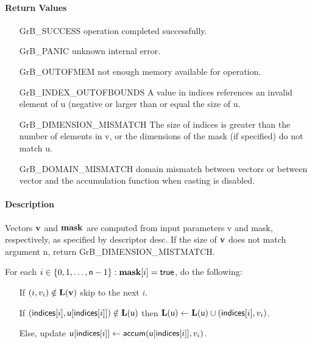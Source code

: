 \paragraph{Return Values}

\begin{itemize}[leftmargin=2.1in]
\item[{\sf GrB\_SUCCESS}]      operation completed successfully.
\item[{\sf GrB\_PANIC}]        unknown internal error.
\item[{\sf GrB\_OUTOFMEM}]     not enough memory available for operation.
\item[{\sf GrB\_INDEX\_OUTOFBOUNDS}]
        A value in {\sf indices} references an invalid element of {\sf u} (negative or larger than or equal the size of {\sf u}.
\item[{\sf GrB\_DIMENSION\_MISMATCH}] 
        The size of {\sf indices} is greater than the number of elements in {\sf v}, or
        the dimensions of the mask (if specified) do not match {\sf u}.
\item[\sf GrB\_DOMAIN\_MISMATCH]  
       domain mismatch between vectors or between vector and the accumulation function when casting is disabled.
\end{itemize}

\paragraph{Description}

Vectors ${\bf v}$ and ${\bf mask}$ are computed from input parameters {\sf v} and {\sf mask}, respectively, as specified by descriptor {\sf desc}. If
the size of ${\bf v}$ does not match argument {\sf n}, return {\sf GrB\_DIMENSION\_MISTMATCH}.

For each $i \in \{0, 1, \ldots, {\sf n}-1 \} : {\bf mask}[i] = {\sf true}$, do the following:
\begin{itemize}
	\item[] If $(i, v_i) \notin \bold{L}({\bf v})$ skip to the next $i$.
	\item[] If $({\sf indices}[i], {\sf u}[{\sf indices}[i]]) \notin \bold{L}({\sf u})$ then
	      $\bold{L}({\sf u}) \leftarrow \bold{L}({\sf u}) \cup ({\sf indices}[i],v_i)$.
	\item[] Else, update ${\sf u}[{\sf indices}[i]] \leftarrow {\sf accum}({\sf u}[{\sf indices}[i]],v_i)$.
\end{itemize}


